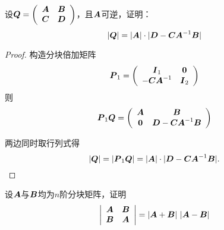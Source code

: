   \begin{li}
    设$\boldsymbol{Q}=\left(
      \begin{array}{cc}
        \boldsymbol{A}&\boldsymbol{B}\\
        \boldsymbol{C}&\boldsymbol{D}
      \end{array}
    \right)$，且$\boldsymbol{A}$可逆，证明：
    $$
    |\boldsymbol{Q}| = |\boldsymbol{A}| \cdot |\boldsymbol{D}-\boldsymbol{C}\boldsymbol{A}^{-1}\boldsymbol{B}|
    $$
  \end{li}
\begin{proof}
  构造分块倍加矩阵
  $$
  \MP_1 = \left(
    \begin{array}{cc}
      \MI_1 & \M0\\
      -\MC\MA^{-1} & \MI_2
    \end{array}
  \right)
  $$ 
  则
  $$
  \MP_1 \MQ = \left(
    \begin{array}{cc}
      \MA & \MB\\
      \M0 & \MD-\MC\MA^{-1}\MB
    \end{array}
  \right)
  $$

  两边同时取行列式得
  $$
  |\boldsymbol{Q}| = |\boldsymbol{P}_1\boldsymbol{Q}| = |\boldsymbol{A}|\cdot |\boldsymbol{D}-\boldsymbol{C}\boldsymbol{A}^{-1}\boldsymbol{B}|.
  $$
\end{proof}



  \begin{li}
    设$\boldsymbol{A}$与$\boldsymbol{B}$均为$n$阶分块矩阵，证明
    $$
    \left|
      \begin{array}{cc}
        \boldsymbol{A}&\boldsymbol{B}\\
        \boldsymbol{B}&\boldsymbol{A}
      \end{array}
    \right| = |\boldsymbol{A}+\boldsymbol{B}|~|\boldsymbol{A}-\boldsymbol{B}|
    $$
  \end{li}



